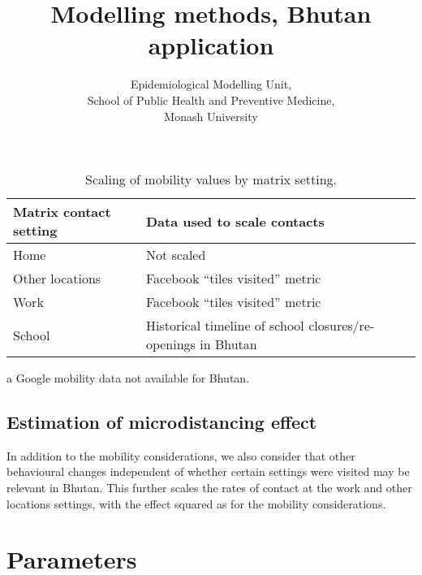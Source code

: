 \documentclass{article}
\author{
    Epidemiological Modelling Unit,
    \\ School of Public Health and Preventive Medicine,
    \\ Monash University
}
\title{Modelling methods, Bhutan application}
\begin{document}
\maketitle
\tableofcontents
\newpage










\begin{table}
    \begin{threeparttable}
    \begin{tabularx}{\textwidth}{| X | X |}
        \hline
        Matrix contact setting & Data used to scale contacts \\
        \hline
        Home & Not scaled \\
        \hline
        Other locations & Facebook ``tiles visited'' metric \tnote{a} \\
        \hline
        Work & Facebook ``tiles visited'' metric \tnote{a} \\
        \hline
        School & Historical timeline of school closures/re-openings in Bhutan \\
        \hline
	\end{tabularx}
	\caption{Scaling of mobility values by matrix setting.}
	\label{tab:location_scaling}
    \begin{tablenotes}
        \item[a] Google mobility data not available for Bhutan.
    \end{tablenotes}
    \end{threeparttable}
\end{table}

\subsection{Estimation of microdistancing effect}
In addition to the mobility considerations, we also consider that other
behavioural changes independent of whether certain settings were visited
may be relevant in Bhutan.
This further scales the rates of contact at the work and other locations settings,
with the effect squared as for the mobility considerations.


\section{Parameters}


\newpage    
\printbibliography
\end{document}
